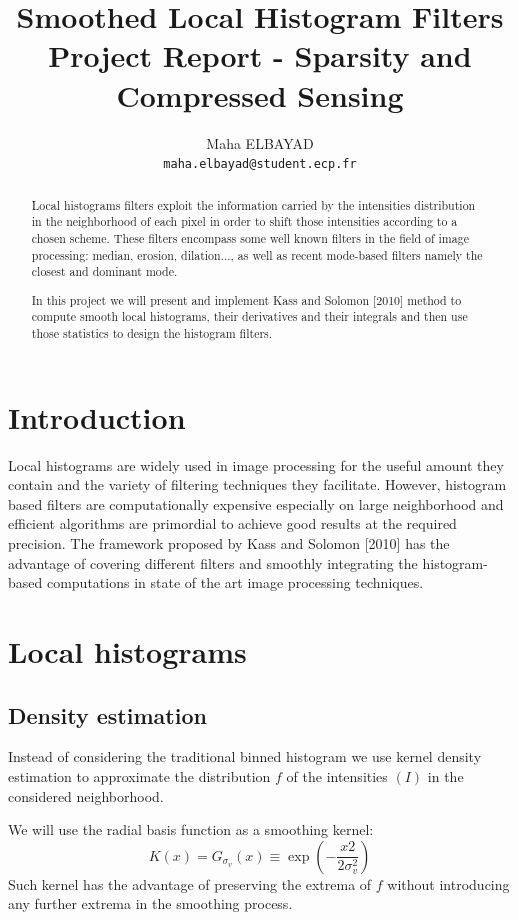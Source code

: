 \documentclass{acmsiggraph}
\title{Smoothed Local Histogram Filters \\
Project Report - Sparsity and Compressed Sensing}
\author{Maha ELBAYAD \\\texttt{maha.elbayad@student.ecp.fr}}
\newcommand{\Gv}{G_{\mathit{\sigma_v}}}
\begin{document}

\maketitle

\begin{abstract}

Local histograms filters exploit the information carried by the intensities distribution in the neighborhood of each pixel in order to shift those intensities according to a chosen scheme. These filters encompass some well known filters in the field of image processing: median, erosion, dilation..., as well as recent mode-based filters namely the closest and dominant mode.

In this project we will present and implement Kass and Solomon [2010] method to compute smooth local histograms, their derivatives and their integrals and then use those statistics to design the histogram filters. 
\end{abstract}

\keywordlist

\section{Introduction}
Local histograms are widely used in image processing for the useful amount they contain and the variety of filtering techniques they facilitate. However, histogram based filters are computationally expensive especially on large neighborhood and efficient algorithms are primordial to achieve good results at the required precision. The framework proposed by Kass and Solomon [2010] has the advantage of covering different filters and smoothly integrating the histogram-based computations in state of the art image processing techniques.

\section{Local histograms}
\subsection{Density estimation}
Instead of considering the traditional binned histogram we use kernel density estimation to approximate the distribution $f$ of the intensities $(I)$ in the considered neighborhood.

We will use the radial basis function as a smoothing kernel:
\[K(x) = \Gv(x) \equiv \exp\left(-\frac{x2}{2\sigma_v^2}\right)\]
Such kernel has the advantage of preserving the extrema of $f$ without introducing any further extrema in the smoothing process.
\end{document}
